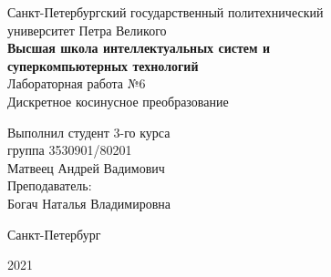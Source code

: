 \documentclass[a4paper]{article}
\begin{document}
    \begin{center}
        \begin{center}
        \hfill \break
        \normalsize{Санкт-Петербургский государственный политехнический}\\
        \normalsize{университет Петра Великого}\\
        \hfill \break
        \normalsize{\textbf{Высшая школа интеллектуальных систем и}}\\ 
        \normalsize{\textbf{суперкомпьютерных технологий}}\\ 
        \hfill \break
        \hfill \break
        \hfill \break
        \normalsize{Лабораторная работа №6}\\
        \hfill \break
        \hfill \break
        \normalsize{\LARGE Дискретное косинусное преобразование}\\
        \end{center}
        \hfill \break
        \hfill \break
        \hfill \break
        \hfill \break
        \hfill \break
        \hfill \break
        \hfill \break
        \hfill \break
        \hfill \break
        \hfill \break
        \begin{flushright}
            \normalsize{Выполнил студент 3-го курса}\\
            \normalsize{группа 3530901/80201}\\
            \normalsize{Матвеец Андрей Вадимович}\\
            \hfill \break
            \normalsize{Преподаватель:}\\
            \normalsize{Богач Наталья Владимировна}\\
        \end{flushright}
        \hfill \break
        \hfill \break
        \hfill \break
        \hfill \break
        \begin{center} Санкт-Петербург\end{center}
        \begin{center}2021\end{center} 
        \thispagestyle{empty}
    \end{center}
    
    \newpage
        \tableofcontents
    
    \newpage
         \listoffigures
    
    \newpage
         \lstlistoflistings   
     
\end{document}
